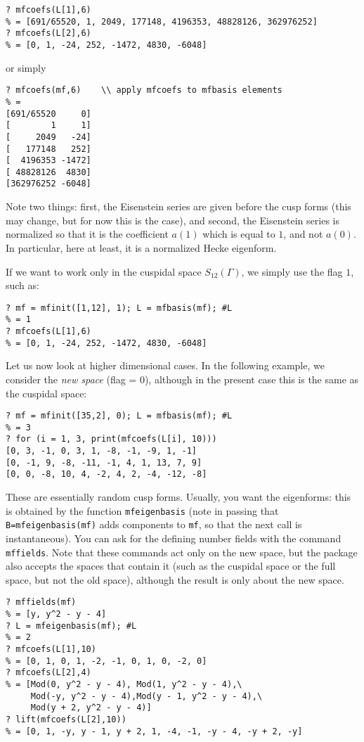 \documentclass[11pt]{article}
\newcommand{\G}{\Gamma}
\def\kbd#1{{\tt #1}}
\begin{document}
\begin{verbatim}
? mfcoefs(L[1],6)
% = [691/65520, 1, 2049, 177148, 4196353, 48828126, 362976252]
? mfcoefs(L[2],6)
% = [0, 1, -24, 252, -1472, 4830, -6048]
\end{verbatim}
or simply
\begin{verbatim}
? mfcoefs(mf,6)    \\ apply mfcoefs to mfbasis elements
% =
[691/65520     0]
[        1     1]
[     2049   -24]
[   177148   252]
[  4196353 -1472]
[ 48828126  4830]
[362976252 -6048]
\end{verbatim}

Note two things: first, the Eisenstein series are given before the cusp forms
(this may change, but for now this is the case), and second, the Eisenstein
series is normalized so that it is the coefficient $a(1)$ which is equal to
$1$, and not $a(0)$. In particular, here at least, it is a normalized
Hecke eigenform.

If we want to work only in the cuspidal space $S_{12}(\G)$, we simply use
the flag $1$, such as:

\begin{verbatim}
? mf = mfinit([1,12], 1); L = mfbasis(mf); #L
% = 1
? mfcoefs(L[1],6)
% = [0, 1, -24, 252, -1472, 4830, -6048]
\end{verbatim}

Let us now look at higher dimensional cases. In the following example, we
consider the \emph{new space} (flag = $0$), although in the present case
this is the same as the cuspidal space:

\begin{verbatim}
? mf = mfinit([35,2], 0); L = mfbasis(mf); #L
% = 3
? for (i = 1, 3, print(mfcoefs(L[i], 10)))
[0, 3, -1, 0, 3, 1, -8, -1, -9, 1, -1]
[0, -1, 9, -8, -11, -1, 4, 1, 13, 7, 9]
[0, 0, -8, 10, 4, -2, 4, 2, -4, -12, -8]
\end{verbatim}

These are essentially random cusp forms. Usually, you want the eigenforms:
this is obtained by the function \kbd{mfeigenbasis} (note in passing that
\kbd{B=mfeigenbasis(mf)} adds components to \kbd{mf}, so that the next
call is instantaneous). You can ask for the defining number fields with the
command \kbd{mffields}. Note that these commands act only on the new space,
but the package also accepts the spaces that contain it (such as the cuspidal
space or the full space, but not the old space), although the result is only
about the new space.

\begin{verbatim}
? mffields(mf)
% = [y, y^2 - y - 4]
? L = mfeigenbasis(mf); #L
% = 2
? mfcoefs(L[1],10)
% = [0, 1, 0, 1, -2, -1, 0, 1, 0, -2, 0]
? mfcoefs(L[2],4)
% = [Mod(0, y^2 - y - 4), Mod(1, y^2 - y - 4),\
     Mod(-y, y^2 - y - 4),Mod(y - 1, y^2 - y - 4),\
     Mod(y + 2, y^2 - y - 4)]
? lift(mfcoefs(L[2],10))
% = [0, 1, -y, y - 1, y + 2, 1, -4, -1, -y - 4, -y + 2, -y]
\end{verbatim}
\end{document}
